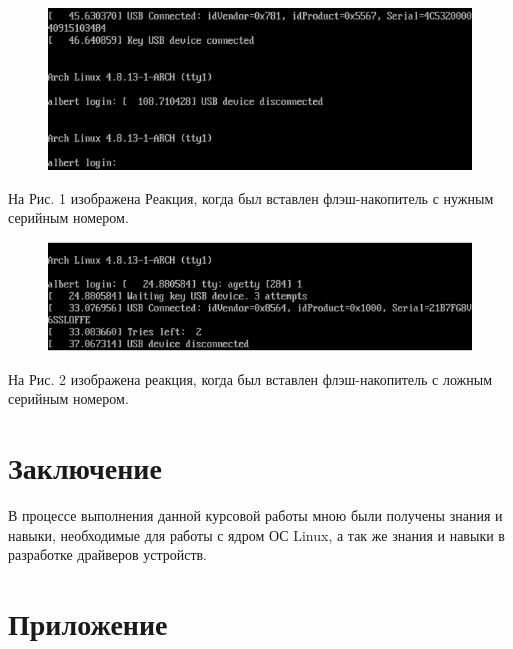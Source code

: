\documentclass[a4paper]{article}
\begin{document}
\begin{figure}[h!]
\clearpage
\centering
\includegraphics[width=16cm]{ok.png} 
\caption{}
\end{figure}

На Рис. 1 изображена Реакция, когда был вставлен флэш-накопитель с нужным серийным номером.

\begin{figure}[h!]
\clearpage
\centering
\includegraphics[width=16cm]{bad.png} 
\caption{}
\end{figure} 

На Рис. 2 изображена реакция, когда был вставлен флэш-накопитель с ложным серийным номером.

\section{Заключение}

В процессе выполнения данной курсовой работы мною были получены знания и навыки, необходимые для работы с ядром ОС Linux, а так же знания и навыки в разработке драйверов устройств. 

\section{Приложение}
\end{document}
